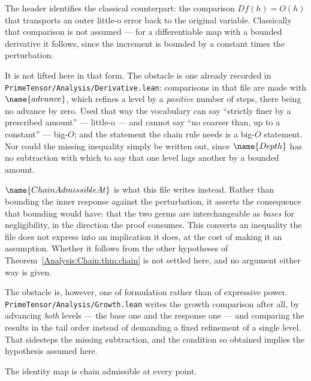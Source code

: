 \begin{designnote}
\label{Analysis:Chain:note:why-hypothesis}
The header identifies the classical counterpart: the comparison
$D f(h) = O(h)$ that transports an outer little-o error back to the original
variable.  Classically that comparison is not assumed --- for a differentiable
map with a bounded derivative it follows, since the increment is bounded by a
constant times the perturbation.

It is not lifted here in that form.  The obstacle is one already recorded in
\texttt{PrimeTensor/Analysis/Derivative.lean}:
comparisons in that file are made with $\name{advance}$, which refines a level by a
\emph{positive} number of steps, there being no advance by zero.  Used that
way the vocabulary can say ``strictly finer by a prescribed amount'' ---
little-o --- and cannot say ``no coarser than, up to a constant'' --- big-$O$;
and the statement the chain rule needs is a big-$O$ statement.  Nor could the
missing inequality simply be written out, since $\name{Depth}$ has no
subtraction with which to say that one level lags another by a bounded amount.

$\name{ChainAdmissibleAt}$ is what this file writes instead.  Rather than
bounding the inner response against the perturbation, it asserts the
consequence that bounding would have: that the two germs are interchangeable
as \emph{bases} for negligibility, in the direction the proof consumes.  This
converts an inequality the file does not express into an implication it does,
at the cost of making it an assumption.  Whether it follows from the other
hypotheses of Theorem~\ref{Analysis:Chain:thm:chain} is not settled here, and
no argument either way is given.

The obstacle is, however, one of formulation rather than of expressive power.
\texttt{PrimeTensor/Analysis/Growth.lean} writes the growth comparison after
all, by advancing \emph{both} levels --- the base one and the response one ---
and comparing the results in the tail order instead of demanding a fixed
refinement of a single level.  That sidesteps the missing subtraction, and the
condition so obtained implies the hypothesis assumed here.
\end{designnote}

\begin{lemma}
\label{Analysis:Chain:lem:adm-id}
The identity map is chain admissible at every point.
\end{lemma}

